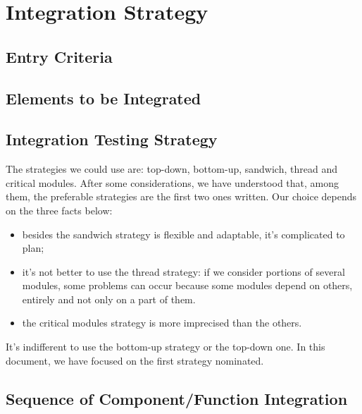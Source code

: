 \section{Integration Strategy}
\subsection{Entry Criteria}
\subsection{Elements to be Integrated}
\subsection{Integration Testing Strategy}
The strategies we could use are: top-down, bottom-up, sandwich, thread and critical modules. After some considerations, we have understood that, among them, the preferable strategies are the first two ones written. Our choice depends on the three facts below:
	\begin{itemize}
		\item besides the sandwich strategy is flexible and adaptable, it's complicated to plan;
		\item it's not better to use the thread strategy: if we consider portions of several modules, some problems can occur because some modules depend on 		others, entirely and not only on a part of them.
		\item the critical modules strategy is more imprecised than the others.      
	\end{itemize} 
It's indifferent to use the bottom-up strategy or the top-down one. In this document, we have focused on the first strategy nominated.
\subsection{Sequence of Component/Function Integration}
